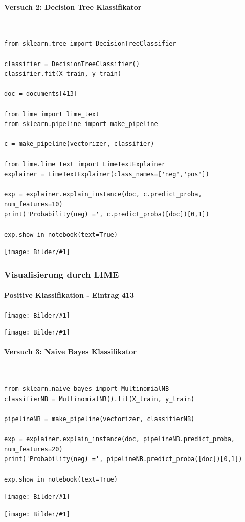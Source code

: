 \documentclass[
  12pt, %
  a4paper, %
  oneside, %
  openany, 
  numbers=noenddot, %
  BCOR=5mm, %
  parskip=half*, %
  thesis, %
]{bfhbook}
\newcommand{\parag}[1]{\paragraph*{#1}\mbox{}\\}
\newcommand{\imgText}[3]{
\begin{center}
    \begin{minipage}[t]{0.6\textwidth}
    		\vspace{0pt}
		\texttt{[image: Bilder/\#1]}
		\caption{#2}
	\end{minipage}\hfill
    \begin{minipage}[t]{0.4\textwidth}
    		\vspace{5pt}
  		#3
    \end{minipage}
\end{center}
}
\begin{document}
\parag{Versuch 2: Decision Tree Klassifikator}

\begin{lstlisting}
from sklearn.tree import DecisionTreeClassifier

classifier = DecisionTreeClassifier()
classifier.fit(X_train, y_train)

doc = documents[413]

from lime import lime_text
from sklearn.pipeline import make_pipeline

c = make_pipeline(vectorizer, classifier)

from lime.lime_text import LimeTextExplainer
explainer = LimeTextExplainer(class_names=['neg','pos'])

exp = explainer.explain_instance(doc, c.predict_proba, num_features=10)
print('Probability(neg) =', c.predict_proba([doc])[0,1])

exp.show_in_notebook(text=True) 
\end{lstlisting}

\imgText{MovieReview-DT-Accuracy.PNG}{}{}

\subsubsection*{Visualisierung durch LIME}
\paragraph*{Positive Klassifikation - Eintrag 413}


\imgText{MovieReview-DecisionTree-Display-413.PNG}{}{
}

\imgText{MovieReview-DecisionTree-Display-414.PNG}{}{
}

\parag{Versuch 3: Naive Bayes Klassifikator}

\begin{lstlisting}
from sklearn.naive_bayes import MultinomialNB
classifierNB = MultinomialNB().fit(X_train, y_train)

pipelineNB = make_pipeline(vectorizer, classifierNB)

exp = explainer.explain_instance(doc, pipelineNB.predict_proba, num_features=20)
print('Probability(neg) =', pipelineNB.predict_proba([doc])[0,1])

exp.show_in_notebook(text=True)
\end{lstlisting}

\imgText{MovieReview-NB-Accuracy.PNG}{}{}

\imgText{MovieReview-NaiveBayes-Display-413.PNG}{}{
}
\end{document}
